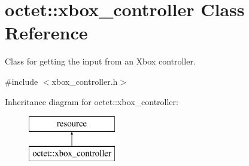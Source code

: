 \hypertarget{classoctet_1_1xbox__controller}{\section{octet\+:\+:xbox\+\_\+controller Class Reference}
\label{classoctet_1_1xbox__controller}
}


Class for getting the input from an Xbox controller.  




{\ttfamily \#include $<$xbox\+\_\+controller.\+h$>$}

Inheritance diagram for octet\+:\+:xbox\+\_\+controller\+:\begin{figure}[H]
\begin{center}
\leavevmode
\includegraphics[height=2.000000cm]{classoctet_1_1xbox__controller}
\end{center}
\end{figure}
